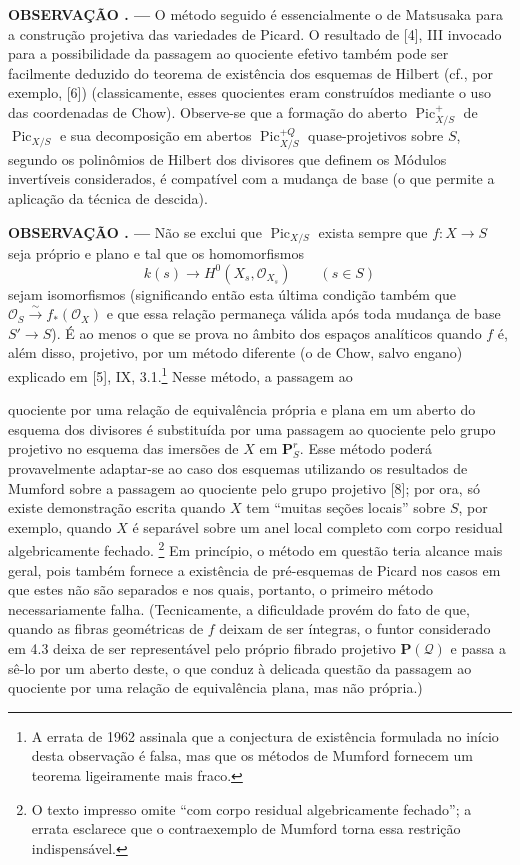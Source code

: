 \documentclass[11pt,twoside,openany]{book}
\numberwithin{equation}{section}
\newcommand{\src}[1]{%
  \phantomsection\hypertarget{src:#1}{}%
  \marginpar{\raggedleft\footnotesize\sffamily #1}%
}
\theoremstyle{plain}
\theoremstyle{definition}
\theoremstyle{remark}
\newcommand{\result}[2]{%
  \par\medskip\noindent\textbf{#1%
  \if\relax\detokenize{#2}\relax\else\space#2\fi. ---}\enspace
}
\newcommand{\FgaUnitKey}{frontmatter}
\renewcommand{\src}[1]{%
  \phantomsection\hypertarget{src:\FgaUnitKey:#1}{}%
  \marginpar{\raggedleft\footnotesize\sffamily #1}%
}
\begin{document}
\result{OBSERVAÇÃO}{5.1} O método seguido é essencialmente o de Matsusaka para
a construção projetiva das variedades de Picard. O resultado de [4], III
invocado para a possibilidade da passagem ao quociente efetivo também pode ser
facilmente deduzido do teorema de existência dos esquemas de Hilbert (cf., por
exemplo, [6]) (classicamente, esses quocientes eram construídos mediante o uso
das coordenadas de Chow). Observe-se que a formação do aberto
$\operatorname{Pic}^{+}_{X/S}$ de $\operatorname{Pic}_{X/S}$ e sua decomposição
em abertos $\operatorname{Pic}^{+Q}_{X/S}$ quase-projetivos sobre $S$, segundo
os polinômios de Hilbert dos divisores que definem os Módulos invertíveis
considerados, é compatível com a mudança de base (o que permite a aplicação da
técnica de descida).

\result{OBSERVAÇÃO}{5.2} Não se exclui que $\operatorname{Pic}_{X/S}$ exista
sempre que $f:X\longrightarrow S$ seja próprio e plano e tal que os
homomorfismos
\[
k(s)\longrightarrow H^0(X_s,\mathcal O_{X_s})\qquad(s\in S)
\]
sejam isomorfismos (significando então esta última condição também que
$\mathcal O_S\xrightarrow{\sim}f_*(\mathcal O_X)$ e que essa relação permaneça
válida após toda mudança de base $S'\longrightarrow S$). É ao menos o que se
prova no âmbito dos espaços analíticos quando $f$ é, além disso, projetivo, por
um método diferente (o de Chow, salvo engano) explicado em [5], IX,
3.1.\footnote{A errata de 1962 assinala que a conjectura de existência formulada
no início desta observação é falsa, mas que os métodos de Mumford fornecem um
teorema ligeiramente mais fraco.} Nesse método, a passagem ao
\src{156}
quociente por uma relação de equivalência própria e plana em um aberto do
esquema dos divisores é substituída por uma passagem ao quociente pelo grupo
projetivo no esquema das imersões de $X$ em $\mathbf P^r_S$. Esse método poderá
provavelmente adaptar-se ao caso dos esquemas utilizando os resultados de
Mumford sobre a passagem ao quociente pelo grupo projetivo [8]; por ora, só
existe demonstração escrita quando $X$ tem ``muitas seções locais'' sobre $S$,
por exemplo, quando $X$ é separável sobre um anel local completo com corpo
residual algebricamente fechado.
\footnote{O texto impresso omite ``com corpo residual algebricamente fechado'';
a errata esclarece que o contraexemplo de Mumford torna essa restrição
indispensável.} Em princípio, o método em questão teria alcance mais geral,
pois também fornece a existência de pré-esquemas de Picard nos casos em que
estes não são separados e nos quais, portanto, o primeiro método necessariamente
falha. (Tecnicamente, a dificuldade provém do fato de que, quando as fibras
geométricas de $f$ deixam de ser íntegras, o funtor considerado em 4.3 deixa de
ser representável pelo próprio fibrado projetivo $\mathbf P(\mathcal Q)$ e
passa a sê-lo por um aberto deste, o que conduz à delicada questão da passagem
ao quociente por uma relação de equivalência plana, mas não própria.)
\end{document}

